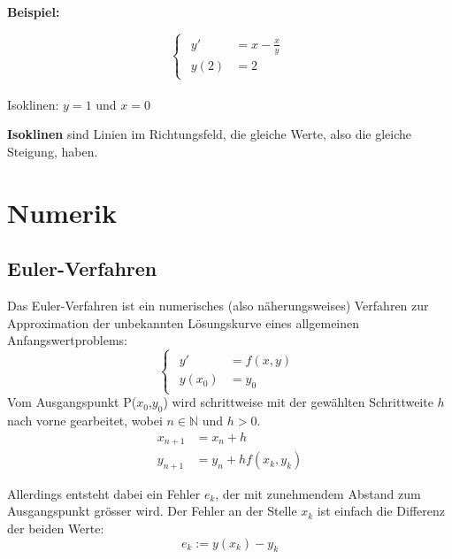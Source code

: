 \documentclass[10pt,a4paper]{article}
\begin{document}
\begin{mdframed}
  \textbf{Beispiel:}
  
  \begin{equation*}
    \begin{cases}
     \begin{aligned}
        y' &= x - \frac{x}{y}\\ 
        y(2) &= 2
      \end{aligned}
  \end{cases}
\end{equation*}
\\
\indent Isoklinen: $y = 1$ und $x = 0$
\end{mdframed}

\begin{Definitionsbox}
  \textbf{Isoklinen} sind Linien im Richtungsfeld, die gleiche Werte, also die gleiche Steigung, haben.
\end{Definitionsbox}

\newpage
\section{Numerik}
\subsection{Euler-Verfahren}
Das Euler-Verfahren ist ein numerisches (also näherungsweises) Verfahren zur Approximation der unbekannten Lösungskurve eines allgemeinen Anfangswertproblems:
\begin{equation*}
  \begin{cases}
    \begin{aligned}
      y' &= f(x,y)\\ 
      y(x_0) &= y_0
    \end{aligned}
  \end{cases}
\end{equation*}
Vom Ausgangspunkt P($x_0$,$y_0$) wird schrittweise mit der gewählten Schrittweite $h$ nach vorne gearbeitet, wobei $n \in \mathbb{N}$ und $h >0$.
\begin{align*}
  x_{n+1} &= x_n + h\\
  y_{n+1} &= y_n + hf(x_k,y_k)
\end{align*}

Allerdings entsteht dabei ein Fehler $e_k$, der mit zunehmendem Abstand zum Ausgangspunkt grösser wird. Der Fehler an der Stelle $x_k$ ist einfach die Differenz der beiden Werte:
\begin{equation*}
  e_k := y(x_k) - y_k
\end{equation*}
\end{document}

